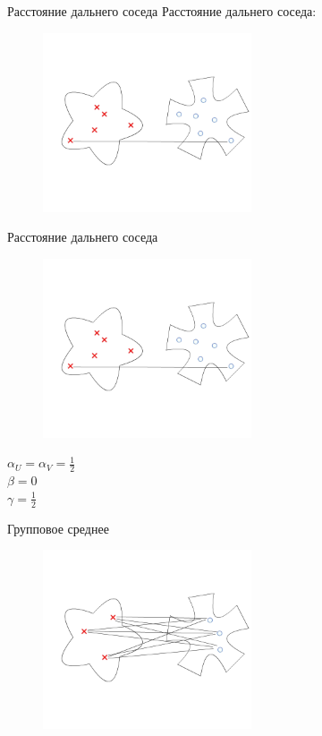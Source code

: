 \documentclass[10pt]{beamer}
\begin{document}
\begin{frame}{Расстояние дальнего соседа}
	Расстояние дальнего соседа:\\
	\begin{figure}[htbp]
	  \includegraphics[height=150pt, keepaspectratio = true]{images/lans2}  
	\end{figure}
\end{frame}

\begin{frame}{Расстояние дальнего соседа}
	\begin{figure}[htbp]
	  \includegraphics[height=150pt, keepaspectratio = true]{images/lans2}  
	\end{figure}
	${\alpha_U = \alpha_V = \frac{1}{2}}$ \\${\beta = 0}$ \\${\gamma = \frac{1}{2}}$
\end{frame}

\begin{frame}{Групповое среднее}
	\begin{figure}[htbp]
	  \includegraphics[height=150pt, keepaspectratio = true]{images/lans3}  
	\end{figure}
\end{frame}
\end{document}
